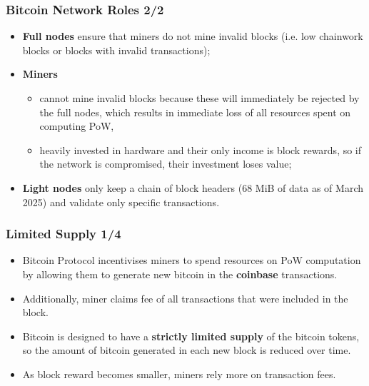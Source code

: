 \documentclass{beamer}
\begin{document}
\begin{frame}
  \frametitle{Bitcoin Network Roles 2/2}
  \begin{itemize}
  \item \textbf{Full nodes} ensure that miners do not mine invalid blocks
    (i.e. low chainwork blocks or blocks with invalid transactions);
  \item \textbf{Miners}
    \begin{itemize}
    \item cannot mine invalid blocks because these will immediately be rejected
      by the full nodes, which results in immediate loss of all resources spent
      on computing PoW,
    \item heavily invested in hardware and their only income is block rewards,
      so if the network is compromised, their investment loses value;
    \end{itemize}
  \item \textbf{Light nodes} only keep a chain of block headers (68 MiB of data
    as of March 2025) and validate only specific transactions.
  \end{itemize}
\end{frame}

\begin{frame}
  \frametitle{Limited Supply 1/4}
  \begin{itemize}
  \item Bitcoin Protocol incentivises miners to spend resources on PoW
    computation by allowing them to generate new bitcoin in the
    \textbf{coinbase} transactions.
  \item Additionally, miner claims fee of all transactions that were included in
    the block.
  \item Bitcoin is designed to have a \textbf{strictly limited supply} of the
    bitcoin tokens, so the amount of bitcoin generated in each new block is
    reduced over time.
  \item As block reward becomes smaller, miners rely more on transaction fees.
  \end{itemize}
\end{frame}
\end{document}
